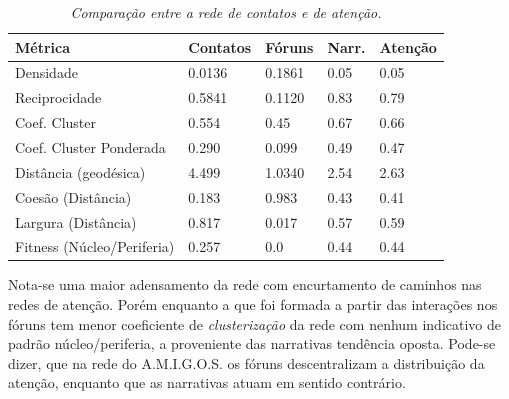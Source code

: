 \documentclass{article}
\begin{document}
\begin{table}[htbp]
\begin{boxedminipage}{\textwidth}
		\setlength{\arrayrulewidth}{2\arrayrulewidth}  %
		\setlength{\belowcaptionskip}{10pt}  %
		\caption{\it Comparação entre a rede de contatos e de atenção.}
		\centering   %
		\begin{tabular}{| l | l | l | l | l |}
		\hline
		Métrica & Contatos & Fóruns & Narr. & Atenção \\ \hline
		Densidade & 0.0136 & 0.1861 & 0.05 & 0.05\\
		Reciprocidade & 0.5841 & 0.1120 & 0.83 & 0.79\\
		Coef. Cluster & 0.554 & 0.45 & 0.67 & 0.66\\
		Coef. Cluster Ponderada & 0.290 & 0.099 & 0.49 & 0.47\\
		Distância (geodésica) & 4.499 & 1.0340 & 2.54 & 2.63\\
		Coesão (Distância) & 0.183 & 0.983 & 0.43 & 0.41\\
		Largura (Distância) & 0.817 & 0.017 & 0.57 & 0.59\\
		Fitness (Núcleo/Periferia) & 0.257 & 0.0 & 0.44 & 0.44\\
		\hline
		\end{tabular}
		\label{tab:comparacao_contato_atencao}
		\flushleft
		\normalsize
		Nota-se uma maior adensamento da rede com encurtamento de caminhos nas redes
		de atenção. Porém enquanto a que foi formada a partir das interações nos
		fóruns tem menor coeficiente de \textit{clusterização} da rede com nenhum
		indicativo de padrão núcleo/periferia, a proveniente das narrativas tendência
		oposta. Pode-se dizer, que na rede do A.M.I.G.O.S. os fóruns descentralizam a
		distribuição da atenção, enquanto que as narrativas atuam em sentido
		contrário.
	\end{boxedminipage}
\end{table}




\end{document}
